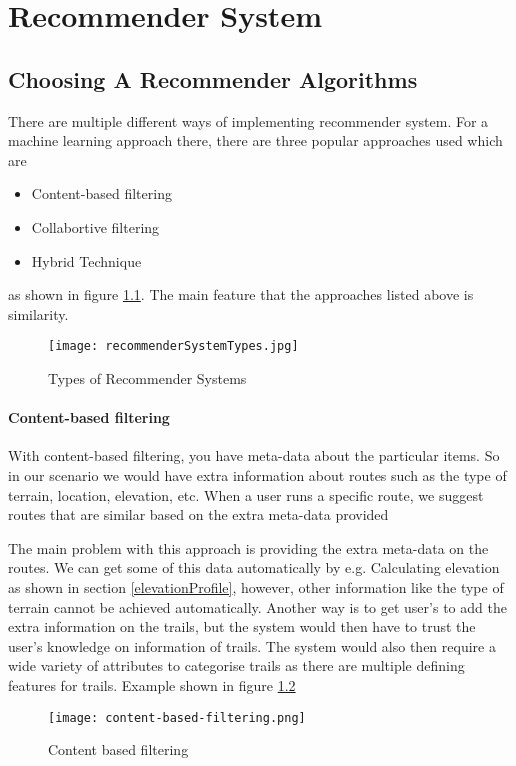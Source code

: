 \chapter{Recommender System} \label{chap:Recommender}

\section{Choosing A Recommender Algorithms} \label{chooseRecAlg}
There are multiple different ways of implementing recommender system. For a machine learning approach there, there are three popular approaches used which are
\begin{itemize}
    \item Content-based filtering
    \item Collabortive filtering
    \item Hybrid Technique
\end{itemize}
as shown in figure \ref{fig:recommenderSystemTypes}. The main feature that the approaches listed above is similarity.

\begin{figure}[ht]
    \centering
    \texttt{[image: recommenderSystemTypes.jpg]}
    \caption{Types of Recommender Systems}
    \label{fig:recommenderSystemTypes}
\end{figure}

\subsubsection{Content-based filtering}
With content-based filtering, you have meta-data about the particular items. So in our scenario we would have extra information about routes such as the type of terrain, location, elevation, etc. When a user runs a specific route, we suggest routes that are similar based on the extra meta-data provided

The main problem with this approach is providing the extra meta-data on the routes. We can get some of this data automatically by e.g. Calculating elevation as shown in section \ref{elevationProfile}, however, other information like the type of terrain cannot be achieved automatically. Another way is to get user's to add the extra information on the trails, but the system would then have to trust the user's knowledge on information of trails. The system would also then require a wide variety of attributes to categorise trails as there are multiple defining features for trails. Example shown in figure \ref{fig:contentBasedFiltering}
\begin{figure}[ht]
    \centering
    \texttt{[image: content-based-filtering.png]}
    \caption{Content based filtering}
    \label{fig:contentBasedFiltering}
\end{figure}

